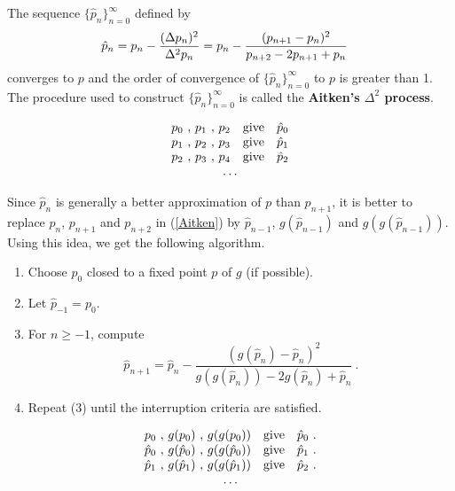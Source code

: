 The sequence $\{\hat{p}_n\}_{n=0}^\infty$ defined by
\begin{equation} \label{Aitken}
\begin{split}
\hat{p}_n &= p_n - \frac{(\Delta{p_n})^2}{\Delta^{2}{p_n}}
= p_n - \frac{(p_{n+1}- p_n)^2}{p_{n+2} -2p_{n+1} + p_n}
\end{split}
\end{equation}
converges to $p$ and the order of convergence of
$\{\hat{p}_n\}_{n=0}^\infty$ to $p$ is greater than 1.
The procedure used to construct $\{\hat{p}_n\}_{n=0}^\infty$ is
called the
{\bfseries Aitken's $\Delta^2$ process}.

\[
\begin{array}{l*{2}{@{\ ,\ }l}@{\quad\text{give}\quad}l}
p_0 & p_1 & p_2 & \hat{p}_0 \\
p_1 & p_2 & p_3 & \hat{p}_1 \\
p_2 & p_3 & p_4 & \hat{p}_2 \\
\multicolumn{4}{c}{\ldots}
\end{array}
\]

Since $\hat{p}_n$ is generally a better approximation of $p$ than
$p_{n+1}$, it is better to replace $p_n$, $p_{n+1}$ and $p_{n+2}$ in
(\ref{Aitken}) by $\hat{p}_{n-1}$, $g(\hat{p}_{n-1})$ and
$g(g(\hat{p}_{n-1}))$.  Using this idea, we get the following
algorithm.

\begin{algo}[Steffensen's]
\begin{enumerate}
\item Choose $p_0$ closed to a fixed point $p$ of $g$ (if possible).
\item Let $\hat{p}_{-1} = p_0$.
\item For $n \geq -1$, compute
\begin{equation} \label{formula4}
\hat{p}_{n+1} = \hat{p}_n - \frac{(g(\hat{p}_n) -
\hat{p}_n)^2}{g(g(\hat{p}_n)) -2 g(\hat{p}_n) + \hat{p}_n} \ .
\end{equation}
\item Repeat (3) until the interruption criteria are satisfied.
\end{enumerate}
\label{SteffAlgo}
\end{algo}

\[
\begin{array}{l*{2}{@{\ ,\ }l}@{\quad\text{give}\quad}l}
p_0 & g(p_0) & g(g(p_0)) & \hat{p}_0 \ . \\
\hat{p}_0 & g(\hat{p}_0) & g(g(\hat{p}_0)) & \hat{p}_1 \ . \\
\hat{p}_1 & g(\hat{p}_1) & g(g(\hat{p}_1)) & \hat{p}_2 \ . \\
\multicolumn{4}{c}{\ldots}
\end{array}
\]

